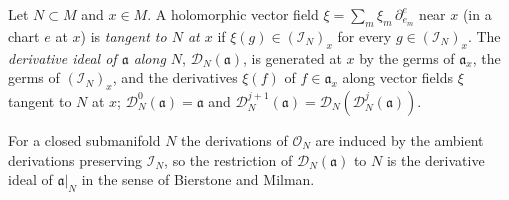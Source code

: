 \begin{definition}
\label{mc:derivative-along}
\leanok
Let \(N\subset M\) and \(x\in M\). A holomorphic vector field \(\xi=\sum_m\xi_m\,\partial^e_{e_m}\) near \(x\) (in a chart \(e\) at \(x\)) is \emph{tangent to
\(N\) at \(x\)} if \(\xi(g)\in(\mathcal I_N)_x\) for every \(g\in(\mathcal I_N)_x\). The \emph{derivative ideal of \(\mathfrak a\) along \(N\)},
\(\mathcal D_N(\mathfrak a)\), is generated at \(x\) by the germs of \(\mathfrak a_x\), the germs of \((\mathcal I_N)_x\), and the derivatives \(\xi(f)\) of
\(f\in\mathfrak a_x\) along vector fields \(\xi\) tangent to \(N\) at \(x\); \(\mathcal D_N^0(\mathfrak a)=\mathfrak a\) and
\(\mathcal D_N^{j+1}(\mathfrak a)=\mathcal D_N(\mathcal D_N^j(\mathfrak a))\).
\end{definition}
For a closed submanifold \(N\) the derivations of \(\mathcal O_N\) are induced by the ambient derivations preserving \(\mathcal I_N\), so the restriction
of \(\mathcal D_N(\mathfrak a)\) to \(N\) is the derivative ideal of \(\mathfrak a|_N\) in the sense of Bierstone and Milman.

